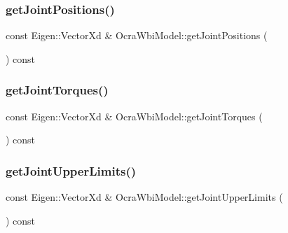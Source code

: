 \hypertarget{classocra__icub_1_1OcraWbiModel_a87ccd2dd7f30319134cbf6431363b0ed}{}\label{classocra__icub_1_1OcraWbiModel_a87ccd2dd7f30319134cbf6431363b0ed} 
\subsubsection{\texorpdfstring{get\+Joint\+Positions()}{getJointPositions()}}
{\footnotesize\ttfamily const Eigen\+::\+Vector\+Xd \& Ocra\+Wbi\+Model\+::get\+Joint\+Positions (\begin{DoxyParamCaption}{ }\end{DoxyParamCaption}) const\hspace{0.3cm}{\ttfamily [virtual]}}

\hypertarget{classocra__icub_1_1OcraWbiModel_a25f75f03583958fddf4313007b0babdb}{}\label{classocra__icub_1_1OcraWbiModel_a25f75f03583958fddf4313007b0babdb} 
\subsubsection{\texorpdfstring{get\+Joint\+Torques()}{getJointTorques()}}
{\footnotesize\ttfamily const Eigen\+::\+Vector\+Xd \& Ocra\+Wbi\+Model\+::get\+Joint\+Torques (\begin{DoxyParamCaption}{ }\end{DoxyParamCaption}) const\hspace{0.3cm}{\ttfamily [virtual]}}

\hypertarget{classocra__icub_1_1OcraWbiModel_a9752d5a831b935c61853b472fc4ff0ac}{}\label{classocra__icub_1_1OcraWbiModel_a9752d5a831b935c61853b472fc4ff0ac} 
\subsubsection{\texorpdfstring{get\+Joint\+Upper\+Limits()}{getJointUpperLimits()}}
{\footnotesize\ttfamily const Eigen\+::\+Vector\+Xd \& Ocra\+Wbi\+Model\+::get\+Joint\+Upper\+Limits (\begin{DoxyParamCaption}{ }\end{DoxyParamCaption}) const\hspace{0.3cm}{\ttfamily [virtual]}}

